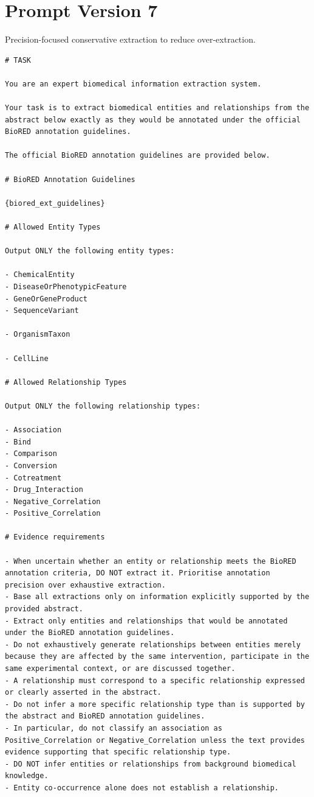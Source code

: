 \section{Prompt Version 7}
Precision-focused conservative extraction to reduce over-extraction.
\begin{lstlisting}
# TASK

You are an expert biomedical information extraction system.

Your task is to extract biomedical entities and relationships from the abstract below exactly as they would be annotated under the official BioRED annotation guidelines.

The official BioRED annotation guidelines are provided below.

# BioRED Annotation Guidelines

{biored_ext_guidelines}

# Allowed Entity Types

Output ONLY the following entity types:

- ChemicalEntity
- DiseaseOrPhenotypicFeature
- GeneOrGeneProduct
- SequenceVariant

- OrganismTaxon

- CellLine

# Allowed Relationship Types

Output ONLY the following relationship types:

- Association
- Bind
- Comparison
- Conversion
- Cotreatment
- Drug_Interaction
- Negative_Correlation
- Positive_Correlation

# Evidence requirements

- When uncertain whether an entity or relationship meets the BioRED annotation criteria, DO NOT extract it. Prioritise annotation precision over exhaustive extraction.
- Base all extractions only on information explicitly supported by the provided abstract.
- Extract only entities and relationships that would be annotated under the BioRED annotation guidelines.
- Do not exhaustively generate relationships between entities merely because they are affected by the same intervention, participate in the same experimental context, or are discussed together.
- A relationship must correspond to a specific relationship expressed or clearly asserted in the abstract.
- Do not infer a more specific relationship type than is supported by the abstract and BioRED annotation guidelines.
- In particular, do not classify an association as Positive_Correlation or Negative_Correlation unless the text provides evidence supporting that specific relationship type.
- DO NOT infer entities or relationships from background biomedical knowledge.
- Entity co-occurrence alone does not establish a relationship.


\end{lstlisting}
